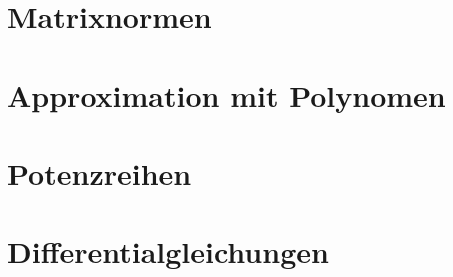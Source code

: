 \section{Matrixnormen}

\section{Approximation mit Polynomen}

\section{Potenzreihen}

\section{Differentialgleichungen}

